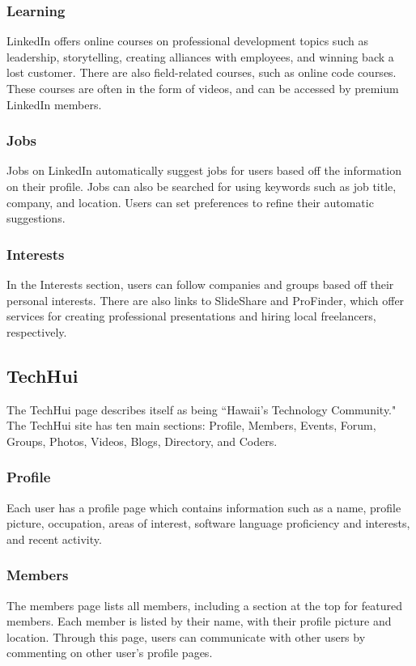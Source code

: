 \subsubsection{Learning}
LinkedIn offers online courses on professional development topics such as leadership, storytelling, creating alliances with employees, and winning back a lost customer. There are also field-related courses, such as online code courses. These courses are often in the form of videos, and can be accessed by premium LinkedIn members. 
\subsubsection{Jobs}
Jobs on LinkedIn automatically suggest jobs for users based off the information on their profile. Jobs can also be searched for using keywords such as job title, company, and location. Users can set preferences to refine their automatic suggestions.
\subsubsection{Interests}
In the Interests section, users can follow companies and groups based off their personal interests. There are also links to SlideShare and ProFinder, which offer services for creating professional presentations and hiring local freelancers, respectively.

\subsection{TechHui}
The TechHui page describes itself as being ``Hawaii's Technology Community." The TechHui site has ten main sections: Profile, Members, Events, Forum, Groups, Photos, Videos, Blogs, Directory, and Coders.
\subsubsection{Profile}
Each user has a profile page which contains information such as a name, profile picture, occupation, areas of interest, software language proficiency and interests, and recent activity.
\subsubsection{Members}
The members page lists all members, including a section at the top for featured members. Each member is listed by their name, with their profile picture and location. Through this page, users can communicate with other users by commenting on other user's profile pages.
